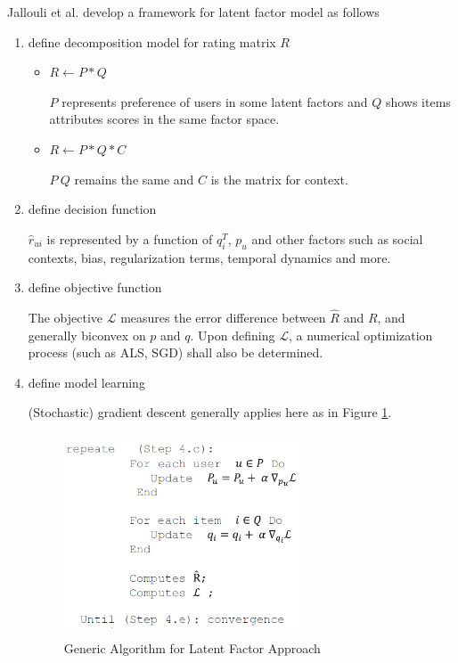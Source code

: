 \documentclass[letter paper, 11pt]{article}
\begin{document}
	Jallouli et al. develop a framework for latent factor model \cite{latentFactor-RS} as follows
	
	\begin{enumerate}
		\item define decomposition model for rating matrix $R$
		
		\begin{itemize}
			\item $ R \leftarrow P * Q $ 
			
			$P$ represents preference of users in some latent factors and $Q$ shows items attributes scores in the same factor space.
			
			\item $ R \leftarrow P * Q * C$
			
			$P\ Q$ remains the same and $C$ is the matrix for context.
		\end{itemize}
		
		\item define decision function
		
		$\hat{r}_{ui}$ is represented by a function of $q_i^T$, $p_u$ and other factors such as social contexts, bias, regularization terms, temporal dynamics and more.
		
		
		\item define objective function
		
		The objective $\mathcal{L}$ measures the error difference between $\hat{R}$ and $R$, and generally biconvex on $p$ and $q$. Upon defining $\mathcal{L}$, a numerical optimization process (such as ALS, SGD) shall also be determined.
		
		\item define model learning
		
		(Stochastic) gradient descent generally applies here as in Figure \ref{fig:generic}. 
		\begin{figure}[h]
			\caption{Generic Algorithm for Latent Factor Approach\cite{latentFactor-RS}}
			\label{fig:generic}
			\centering
			\includegraphics[width=7cm, height=6cm]{Latent-factor-Framework1.png}
		\end{figure}
		
	\end{enumerate}
\end{document}
